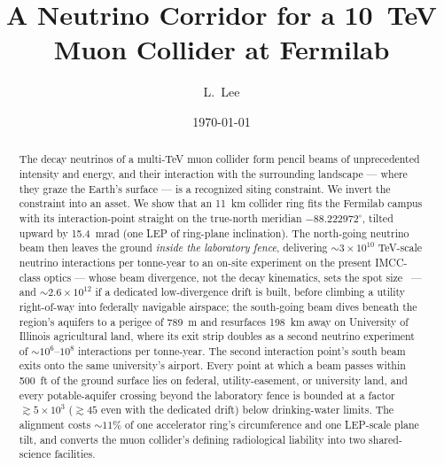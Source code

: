 \documentclass[aps,prl,reprint,superscriptaddress,nofootinbib]{revtex4-2}
\begin{document}
\title{A Neutrino Corridor for a 10~TeV Muon Collider at Fermilab}

\author{L.~Lee}

\date{\today}

\begin{abstract}
The decay neutrinos of a multi-TeV muon collider form pencil beams of
unprecedented intensity and energy, and their interaction with the
surrounding landscape --- where they graze the Earth's surface --- is a
recognized siting constraint. We invert the constraint into an asset. We
show that an 11~km collider ring fits the Fermilab campus with its
interaction-point straight on the true-north meridian $-88.222972^\circ$,
tilted upward by 15.4~mrad (one LEP of ring-plane inclination). The
north-going neutrino beam then leaves the ground \emph{inside the
laboratory fence}, delivering ${\sim}3\times10^{10}$ TeV-scale neutrino
interactions per tonne-year to an on-site experiment on the present
IMCC-class optics --- whose beam divergence, not the decay kinematics,
sets the spot size~\cite{MINT} --- and ${\sim}2.6\times10^{12}$ if a
dedicated low-divergence drift is built, before climbing a utility
right-of-way into federally navigable airspace; the south-going
beam dives beneath the region's aquifers to a perigee of 789~m and
resurfaces 198~km away on University of Illinois agricultural land, where
its exit strip doubles as a second neutrino experiment of
${\sim}10^{6}$--$10^{8}$ interactions per tonne-year. The second interaction point's
south beam exits onto the same university's airport. Every point at which
a beam passes within 500~ft of the ground surface lies on federal,
utility-easement, or university land, and every potable-aquifer crossing
beyond the laboratory fence is bounded at a factor ${\gtrsim}5\times10^{3}$
(${\gtrsim}45$ even with the dedicated drift) below drinking-water
limits. The
alignment costs ${\sim}11\%$ of one accelerator ring's circumference and
one LEP-scale plane tilt, and converts the muon collider's defining
radiological liability into two shared-science facilities.
\end{abstract}

\maketitle
\end{document}
